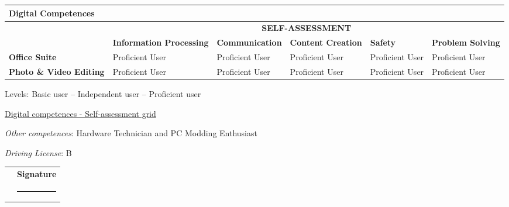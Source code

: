 \documentclass[a4paper, 10pt]{article}
\begin{document}
\begin{table}[H]
	\centering
	\renewcommand\arraystretch{1.5}
	\renewcommand\tabularxcolumn[1]{>{\centering\arraybackslash}m{#1}}
	\setlength{\tabcolsep}{6pt}
	\begin{tabularx}{\textwidth}{l*{5}{X}}
		\multicolumn{6}{l}{\textbf{{Digital Competences}}} \\[4pt]
		\toprule
		& \multicolumn{5}{c}{\textbf{{SELF-ASSESSMENT}}} \\
		\cmidrule(lr){2-6}
		& {\textbf{Information Processing}}
		& {\textbf{Communication}}
		& {\textbf{Content Creation}}
		& {\textbf{Safety}}
		& {\textbf{Problem Solving}} \\
		\midrule
		\textbf{Office Suite} & Proficient User & Proficient User & Proficient User & Proficient User & Proficient User \\
		\textbf{Photo \& Video Editing} & Proficient User & Proficient User & Proficient User & Proficient User & Proficient User \\
		\bottomrule
	\end{tabularx}
	
	\vspace{4pt}
	{\footnotesize
		{Levels: Basic user – Independent user – Proficient user} \par
		\href{https://www.kutseregister.ee/ctrl/en/Standardid\_Lisa/downloadFile/11204067}{Digital competences - Self-assessment grid}
	}
\end{table}

\skillListStart
\justifying
\item \emph{Other competences}: Hardware Technician and PC Modding Enthusiast
\item \emph{Driving License}: B
\skillListEnd

\vspace{1cm}


\vspace{1cm}


\begin{tabularx}{\textwidth}{>{\centering\arraybackslash}X >{\centering\arraybackslash}X}
	{\textbf{Date}} &
	{\textbf{Signature}} \\[0.3cm]
	\rule{4cm}{0.3pt} & \rule{4cm}{0.3pt} \\[-0.1cm]
\end{tabularx}
\end{document}
